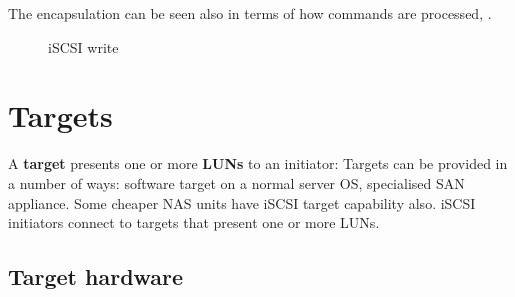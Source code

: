 The encapsulation can be seen also in terms of how commands are
processed, .

\begin{figure}
\centering
\caption{iSCSI write{}}
\end{figure}

\section{Targets}\label{targets}

A \textbf{target} presents one or more \textbf{LUNs} to an initiator:
Targets can be provided in a number of ways: software target on a normal
server OS, specialised SAN appliance. Some cheaper NAS units have iSCSI
target capability also. iSCSI initiators connect to targets that present
one or more LUNs.

\subsection{Target hardware}\label{target-hardware}

